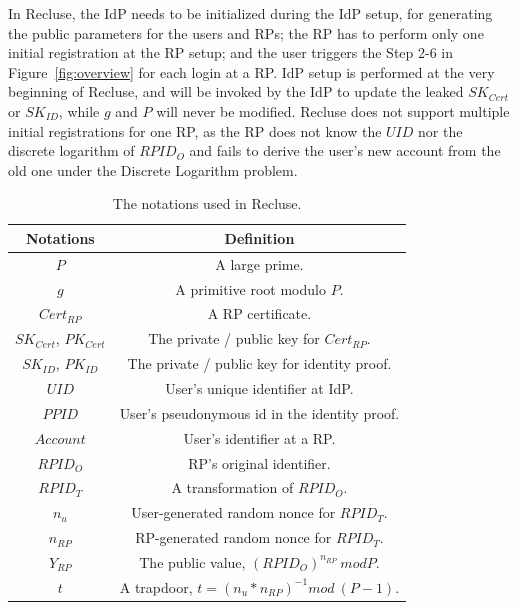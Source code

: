 In Recluse, the IdP needs to be initialized during the IdP setup, for generating the public parameters for the users and RPs; the RP has to perform only one initial registration at the RP setup; and  the user triggers the Step 2-6 in Figure~\ref{fig:overview} for each login at a RP. IdP setup is performed at the very beginning of Recluse, and will be invoked by the IdP to update the leaked $SK_{Cert}$ or $SK_{ID}$, while $g$ and $P$ will never be modified. Recluse does not support multiple initial registrations for one RP, as the RP does not know the $UID$ nor the discrete logarithm of $RPID_O$ and fails to derive the user's new account  from the old one under the Discrete Logarithm problem.


\begin{table}[tb]
    \caption{The notations used in Recluse.}
    \centering
    \begin{tabular}{|c|c|}
    \hline
    {Notations} & {Definition} \\
    \hline
    {$P$} & {A large prime.} \\
    \hline
    {$g$} & {A primitive root  modulo $P$.} \\
    \hline
    {$Cert_{RP}$} & {A RP certificate.} \\
    \hline
    {$SK_{Cert}$, $PK_{Cert}$} & {The private / public key for $Cert_{RP}$.} \\
    \hline
    {$SK_{ID}$, $PK_{ID}$} & {The private / public key for  identity proof.} \\
    \hline
    {$UID$} & {User's unique identifier at IdP.} \\
    \hline
    {$PPID$} & {User's pseudonymous id in the identity proof.} \\
    \hline
    {$Account$} & {User's identifier at a RP.} \\
    \hline
    {$RPID_O$} & {RP's original identifier.} \\
    \hline
    {$RPID_T$} & {A transformation of $RPID_O$.} \\
    \hline
    {$n_u$} & {User-generated random nonce for $RPID_T$. } \\
    \hline
    {$n_{RP}$} & {RP-generated random nonce for $RPID_T$. } \\
    \hline
    {$Y_{RP}$} & {The public value, $(RPID_O)^{n_{RP}} \ mod P$. } \\
    \hline
    {$t$} & {A trapdoor, $t=(n_u*n_{RP})^{-1} mod \ (P-1)$. } \\
    \hline
    \end{tabular}
    \label{tbl:notations}
\end{table}

